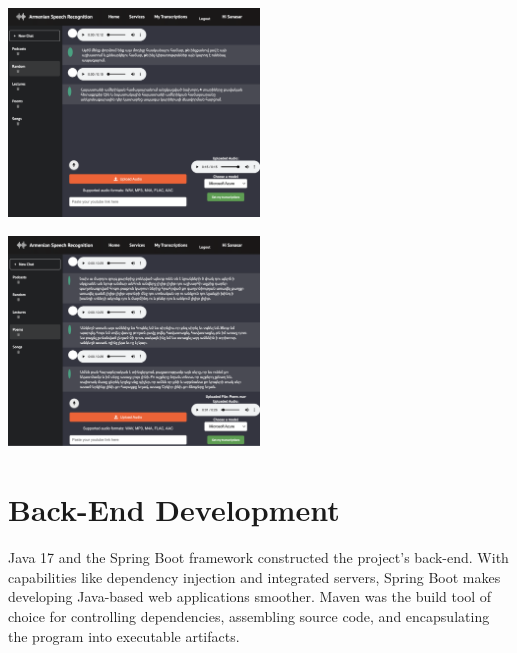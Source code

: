 \documentclass[conference]{IEEEtran}
\begin{document}
\begin{center}
    \includegraphics[width=0.5\textwidth]{RandomChat.png}
    \label{fig:ui_design_2}
\end{center}

\begin{center}
    \includegraphics[width=0.5\textwidth]{PoemsChat.png}
    \label{fig:ui_design_1}
\end{center}












\section{Back-End Development}

Java 17 and the Spring Boot framework constructed the project's back-end. With capabilities like dependency injection and integrated servers, Spring Boot makes developing Java-based web applications smoother. Maven was the build tool of choice for controlling dependencies, assembling source code, and encapsulating the program into executable artifacts.
\end{document}
